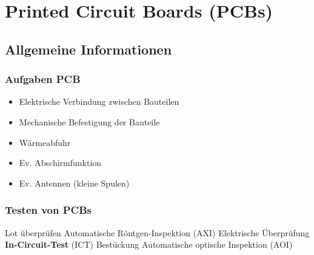 \section{Printed Circuit Boards (PCBs)}


\subsection{Allgemeine Informationen}

\begin{minipage}[t]{0.42\columnwidth}
    \subsubsection{Aufgaben PCB}

     \begin{itemize}
        \item Elektrische Verbindung zwischen Bauteilen
        \item Mechanische Befestigung der Bauteile
        \item Wärmeabfuhr
        \item Ev. Abschirmfunktion
        \item Ev. Antennen (kleine Spulen)
     \end{itemize}
\end{minipage}
\hfill
\begin{minipage}[t]{0.56\columnwidth}
    \subsubsection{Testen von PCBs}

    \begin{outline}
        \1 Lot überprüfen
            \2 Automatische Röntgen-Inspektion (AXI)
        \1 Elektrische Überprüfung
            \2 \textbf{In-Circuit-Test} (ICT)
        \1 Bestückung
            \2 Automatische optische Inspektion (AOI)
    \end{outline}
\end{minipage}


